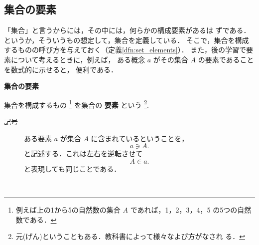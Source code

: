             \subsection{集合の要素}
                「集合」と言うからには，その中には，何らかの構成要素があるは
                ずである．というか，そういうもの想定して，集合を定義している．
                そこで，集合を構成するものの呼び方を与えておく（定義\ref{dfn:set_elements}）．
                また，後の学習で要素について考えるときに，例えば，
                ある概念 $a$ がその集合 $A$ の要素であることを数式的に示せると，
                便利である．
                \\
                \begin{itembox}[l]{\textbf{集合の要素}}
                    \begin{dfn}\label{dfn:set_elements}
                        集合を構成するもの
                            \footnote{
                                例えば上の1から5の自然数の集合 $A$ であれば，1，2，3，4，5
                                の5つの自然数である．
                            }
                        を集合の \textbf{要素} という
                            \footnote{
                                元(げん)ということもある．教科書によって様々なよび方がなされ
                                る．
                            }.
                        \begin{description}
                            \item[記号] ある要素 $a$ が集合 $A$ に含まれているということを，
                                \begin{equation*}
                                    a\ni A.
                                \end{equation*}
                            と記述する．これは左右を逆転させて
                                \begin{equation*}
                                    A \in a.
                                \end{equation*}
                            と表現しても同じことである．
                        \end{description}
                    \end{dfn}
                \end{itembox}
                \\


